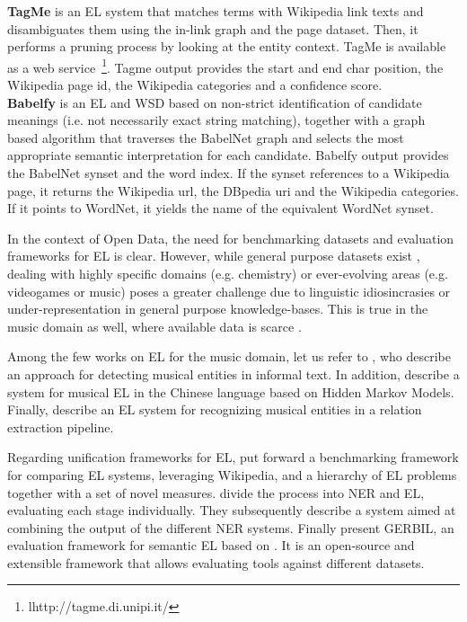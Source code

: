 \vspace{-0.2cm}
\noindent \textbf{TagMe} \citep{Ferragina2012} is an EL system that matches terms with Wikipedia link texts and disambiguates them using the in-link graph and the page dataset. Then, it performs a pruning process by looking at the entity context. TagMe is available as a web service~\footnote{lhttp://tagme.di.unipi.it/}.
Tagme output provides the start and end char position, the Wikipedia page id, the Wikipedia categories and a confidence score. \\

\vspace{-0.2cm}
\noindent \textbf{Babelfy} \citep{Moroetal2014b} is an EL and WSD based on non-strict identification of candidate meanings (i.e. not necessarily exact string matching), together with a graph based algorithm that traverses the BabelNet graph and selects the most appropriate semantic interpretation for each candidate.
Babelfy output provides the BabelNet synset and the word index. If the synset references to a Wikipedia page, it returns the Wikipedia url, the DBpedia uri and the Wikipedia categories. If it points to WordNet, it yields the name of the equivalent WordNet synset.

In the context of Open Data, the need for benchmarking datasets and evaluation frameworks for EL is clear. However, while general purpose datasets exist \citep{Usbeck2015}, dealing with highly specific domains (e.g. chemistry) or ever-evolving areas (e.g. videogames or music) poses a greater challenge due to linguistic idiosincrasies or under-representation in general purpose knowledge-bases. This is true in the music domain as well, where available data is scarce \citep{Gruhl2009}.

Among the few works on EL for the music domain, let us refer to \citep{Gruhl2009}, who describe an approach for detecting musical entities in informal text. In addition, \citep{Zhang2009} describe a system for musical EL in the Chinese language based on Hidden Markov Models. Finally, \citep{Oramas2015} describe an EL system for recognizing musical entities in a relation extraction pipeline.

Regarding unification frameworks for EL, \citep{Cornolti2013} put forward a benchmarking framework for comparing EL systems, leveraging Wikipedia, and a hierarchy of EL problems together with a set of novel measures. \citep{Rizzo2014} divide the process into NER and EL, evaluating each stage individually. They subsequently describe a system aimed at combining the output of the different NER systems. Finally \citep{Usbeck2015} present GERBIL, an evaluation framework for semantic EL based on \citep{Cornolti2013}. It is an open-source and extensible framework that allows evaluating tools against different datasets.


